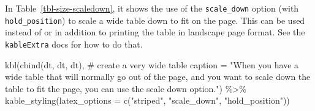 \documentclass[
  letterpaper,
  DIV=11,
  numbers=noendperiod]{scrartcl}
\newenvironment{Shaded}{\begin{snugshade}}{\end{snugshade}}
\newcommand{\AttributeTok}[1]{\textcolor[rgb]{0.40,0.45,0.13}{#1}}
\newcommand{\CommentTok}[1]{\textcolor[rgb]{0.37,0.37,0.37}{#1}}
\newcommand{\FunctionTok}[1]{\textcolor[rgb]{0.28,0.35,0.67}{#1}}
\newcommand{\NormalTok}[1]{\textcolor[rgb]{0.00,0.23,0.31}{#1}}
\newcommand{\SpecialCharTok}[1]{\textcolor[rgb]{0.37,0.37,0.37}{#1}}
\newcommand{\StringTok}[1]{\textcolor[rgb]{0.13,0.47,0.30}{#1}}
\begin{document}
In Table~\ref{tbl-size-scaledown}, it shows the use of the
\texttt{scale\_down} option (with \texttt{hold\_position}) to scale a
wide table down to fit on the page. This can be used instead of or in
addition to printing the table in landscape page format. See the
\texttt{kableExtra} docs for how to do that.

\begin{Shaded}
\begin{Highlighting}[]
\FunctionTok{kbl}\NormalTok{(}\FunctionTok{cbind}\NormalTok{(dt, dt, dt), }\CommentTok{\# create a very wide table}
    \AttributeTok{caption =} \StringTok{"When you have a wide table that will normally go out of the page, and you want to scale down the table to fit the page, you can use the scale down option."}\NormalTok{) }\SpecialCharTok{\%\textgreater{}\%}
  \FunctionTok{kable\_styling}\NormalTok{(}\AttributeTok{latex\_options =} \FunctionTok{c}\NormalTok{(}\StringTok{"striped"}\NormalTok{, }\StringTok{"scale\_down"}\NormalTok{, }\StringTok{"hold\_position"}\NormalTok{))}
\end{Highlighting}
\end{Shaded}
\end{document}
